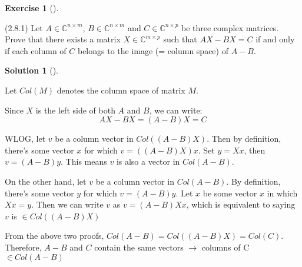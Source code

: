 \documentclass[numbers=enddot,12pt,final,onecolumn,notitlepage]{scrartcl}
\newcounter{exer}
\newcounter{sol}
\theoremstyle{definition}
\newtheorem{exmp}[exer]{Exercise}
\newenvironment{exercise}[1][]
{\begin{exmp}[#1]\begin{leftbar}}
        {\end{leftbar}\end{exmp}}
\newtheorem{solu}[sol]{Solution}
\newenvironment{solution}[1][]
{\begin{solu}[#1]\begin{leftbar}}
        {\end{leftbar}\end{solu}}
\begin{document}
\begin{exercise}
	\label{exe.schurtri.syl.AX-BX} (2.8.1) Let $A\in\mathbb{C}^{n\times m}$,
	$B\in\mathbb{C}^{n\times m}$ and $C\in\mathbb{C}^{n\times p}$ be three complex
	matrices. Prove that there exists a matrix $X\in\mathbb{C}^{m\times p}$ such
	that $AX-BX=C$ if and only if each column of $C$ belongs to the image (=
	column space) of $A-B$.
\end{exercise}

\begin{solution}
	Let $Col(M)$ denotes the column space of matrix $M$.
	\bigskip

	Since $X$ is the left side of both $A$ and $B$, we can write:
	\[
		AX - BX = (A-B)X = C
	\]

	WLOG, let $v$ be a column vector in $Col((A-B)X)$. Then by definition, there's some vector $x$ for which $v = ((A-B)X)x$. Set $y = Xx$, then $v = (A-B)y$. This means $v$ is also a vector in $Col(A-B)$.
	\bigskip

	On the other hand, let $v$ be a column vector in $Col(A-B)$. By definition, there's some vector $y$ for which $v = (A-B)y$. Let $x$ be some vector $x$ in which $Xx = y$. Then we can write $v$ as $v = (A-B)Xx$, which is equivalent to saying $v$ is $\in Col((A-B)X)$

	From the above two proofs, $Col(A-B) = Col((A-B)X) = Col(C)$. Therefore, $A-B$ and $C$ contain the same vectors $\rightarrow$ columns of C $\in Col(A - B)$

\end{solution}
\end{document}
